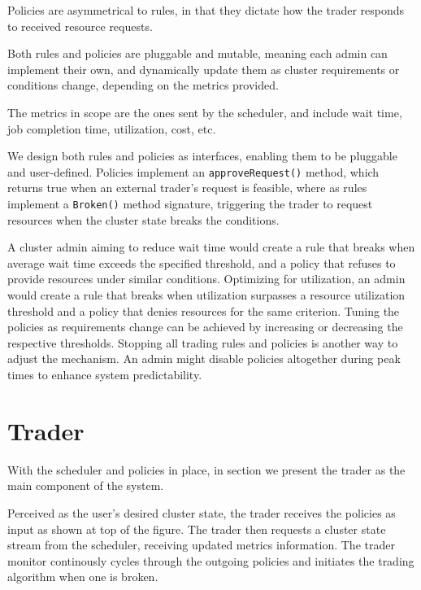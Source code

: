 
Policies are asymmetrical to rules, in that they dictate how the trader
responds to received resource requests.

Both rules and policies are pluggable and mutable, meaning each admin can
implement their own, and dynamically update them as cluster requirements or
conditions change, depending on the metrics provided. 

The metrics in scope are the ones sent by the scheduler, and include wait time,
job completion time, utilization, cost, etc. 

We design both rules and policies as interfaces, enabling them to
be pluggable and user-defined. Policies implement an
\texttt{approveRequest()} method, which returns true when an external trader's
request is feasible, where as rules implement a \texttt{Broken()} method
signature, triggering the trader to request resources when the cluster state
breaks the conditions.  

A cluster admin aiming to reduce wait time would create a rule that breaks when
average wait time exceeds the specified threshold, and a policy that refuses to
provide resources under similar conditions. Optimizing for utilization, an
admin would create a rule that breaks when utilization surpasses a resource
utilization threshold and a policy that denies resources for the same
criterion. Tuning the policies as requirements change can be achieved by
increasing or decreasing the respective thresholds. Stopping all trading rules
and policies is another way to adjust the mechanism. An admin might disable
policies altogether during peak times to enhance system predictability. 

\section{Trader} \label{trader}

With the scheduler and policies in place, in section we present the trader
as the main component of the system.

Perceived as the user's desired cluster state, the trader receives the policies
as input as shown at top of the figure. The trader then requests a cluster
state stream from the scheduler, receiving updated metrics information. The
trader monitor continously cycles through the outgoing policies and initiates
the trading algorithm when one is broken.

